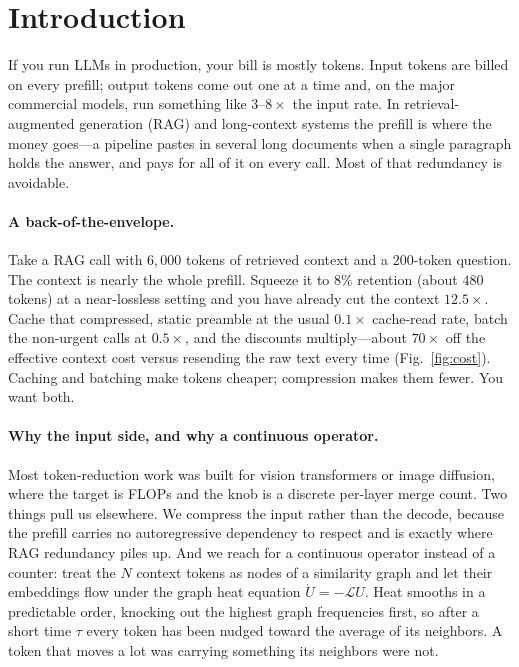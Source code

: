 \documentclass[11pt]{article}
\newcommand{\rwL}{\mathcal{L}}
\begin{document}
\section{Introduction}
\label{sec:intro}

If you run LLMs in production, your bill is mostly tokens. Input tokens are billed on every
prefill; output tokens come out one at a time and, on the major commercial models, run something
like $3$--$8\times$ the input rate. In retrieval-augmented generation (RAG) and long-context
systems the prefill is where the money goes---a pipeline pastes in several long documents when a
single paragraph holds the answer, and pays for all of it on every call. Most of that redundancy
is avoidable.

\paragraph{A back-of-the-envelope.}
Take a RAG call with $6{,}000$ tokens of retrieved context and a $200$-token question. The
context is nearly the whole prefill. Squeeze it to $8\%$ retention (about $480$ tokens) at a
near-lossless setting and you have already cut the context $12.5\times$. Cache that compressed,
static preamble at the usual $0.1\times$ cache-read rate, batch the non-urgent calls at
$0.5\times$, and the discounts multiply---about $70\times$ off the effective context cost versus
resending the raw text every time (Fig.~\ref{fig:cost}). Caching and batching make tokens cheaper;
compression makes them fewer. You want both.

\paragraph{Why the input side, and why a continuous operator.}
Most token-reduction work was built for vision transformers or image diffusion, where the target
is FLOPs and the knob is a discrete per-layer merge count. Two things pull us elsewhere. We
compress the input rather than the decode, because the prefill carries no autoregressive
dependency to respect and is exactly where RAG redundancy piles up. And we reach for a continuous
operator instead of a counter: treat the $N$ context tokens as nodes of a similarity graph and let
their embeddings flow under the graph heat equation $\dot U=-\rwL U$. Heat smooths in a
predictable order, knocking out the highest graph frequencies first, so after a short time $\tau$
every token has been nudged toward the average of its neighbors. A token that moves a lot was
carrying something its neighbors were not.
\end{document}
